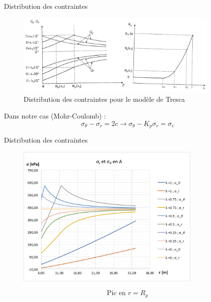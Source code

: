 \documentclass{beamer}
\begin{document}
\begin{frame}{Distribution des contraintes}

\begin{figure}
    \centering
    \includegraphics[height=4cm]{SigTresca.png}
    \caption{\scriptsize{Distribution des contraintes pour le modèle de Tresca}}
    \label{SigTresca}
\end{figure}
\vspace{-0.2cm}
Dans notre cas (Mohr-Coulomb) : \[\sigma_{\theta}-\sigma_r=2c\longrightarrow \sigma_{\theta}-K_p\sigma_r=\sigma_c\]


\end{frame}



\begin{frame}{Distribution des contraintes}

\begin{figure}
\centering
\includegraphics[width=9cm]{sig_A2.png}
\end{figure}
\[\text{Pic en }r=R_p\]
\end{frame}
\end{document}
